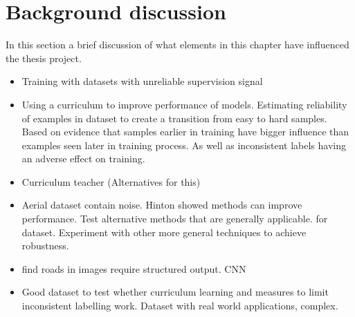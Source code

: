 \section{Background discussion}
\label{sec:backgroundDiscussion}
In this section a brief discussion of what elements in this chapter have influenced the thesis project.

\begin{itemize}
\item Training with datasets with unreliable supervision signal
\item Using a curriculum to improve performance of models. Estimating reliability of 
examples in dataset to create a transition from easy to hard samples. Based on 
evidence that samples earlier in training have bigger influence than examples seen later in training process. As well as inconsistent labels having an adverse effect on 
training.
\item Curriculum teacher (Alternatives for this)
\item Aerial dataset contain noise. Hinton showed methods can improve performance. Test alternative methods that are generally applicable.  for dataset.
Experiment with other more general techniques to achieve robustness.
\item find roads in images require structured output. CNN 
\item Good dataset to test whether curriculum learning and measures to limit inconsistent labelling work. Dataset with real world applications, complex.
\end{itemize}